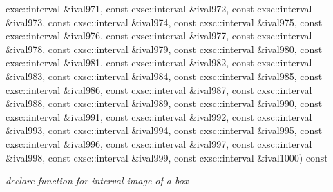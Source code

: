 \begin{DoxyCompactItemize}
cxsc\-::interval \&ival971, const cxsc\-::interval \&ival972, const cxsc\-::interval \&ival973, const cxsc\-::interval \&ival974, const cxsc\-::interval \&ival975, const cxsc\-::interval \&ival976, const cxsc\-::interval \&ival977, const cxsc\-::interval \&ival978, const cxsc\-::interval \&ival979, const cxsc\-::interval \&ival980, const cxsc\-::interval \&ival981, const cxsc\-::interval \&ival982, const cxsc\-::interval \&ival983, const cxsc\-::interval \&ival984, const cxsc\-::interval \&ival985, const cxsc\-::interval \&ival986, const cxsc\-::interval \&ival987, const cxsc\-::interval \&ival988, const cxsc\-::interval \&ival989, const cxsc\-::interval \&ival990, const cxsc\-::interval \&ival991, const cxsc\-::interval \&ival992, const cxsc\-::interval \&ival993, const cxsc\-::interval \&ival994, const cxsc\-::interval \&ival995, const cxsc\-::interval \&ival996, const cxsc\-::interval \&ival997, const cxsc\-::interval \&ival998, const cxsc\-::interval \&ival999, const cxsc\-::interval \&ival1000) const 
\begin{DoxyCompactList}\small\item\em declare function for interval image of a box \end{DoxyCompactList}\item 

\end{DoxyCompactItemize}
